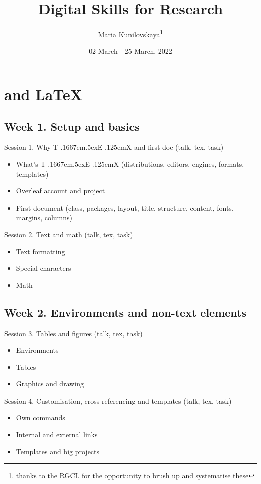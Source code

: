 \documentclass[a4paper,12pt]{article} %
\title{Digital Skills for Research}
\author{Maria Kunilovskaya\thanks{thanks to the RGCL for the opportunity to brush up and systematise these}}
\date{02 March - 25 March, 2022}
\def\TeX{{\rm T\kern-.1667em\lower.5ex\hbox{E}\kern-.125emX }}
\begin{document}
	
	\maketitle

\vspace{-2em}

\section{{\color{red}\TeX and \LaTeX}}

\subsection{Week 1. Setup and basics}
	Session 1. Why \TeX and first doc (talk, tex, task)
		\begin{itemize}
			\item What's \TeX (distributions, editors, engines, formats, templates)
			\item Overleaf account and project
			\item First document (class, packages, layout, title, structure, content, fonts, margins, columns)
		\end{itemize} 
	Session 2. Text and math (talk, tex, task)
		\begin{itemize}
			\item Text formatting
			\item Special characters
			\item Math
		\end{itemize}

\subsection*{Week 2. Environments and non-text elements}
	Session 3. Tables and figures (talk, tex, task)
			\begin{itemize}
				\item Environments
				\item Tables
				\item Graphics and drawing
			\end{itemize}
	Session 4. Customisation, cross-referencing and templates (talk, tex, task)
			\begin{itemize}
				\item Own commands
				\item Internal and external links
				\item Templates and big projects
			\end{itemize}
		
\end{document}
